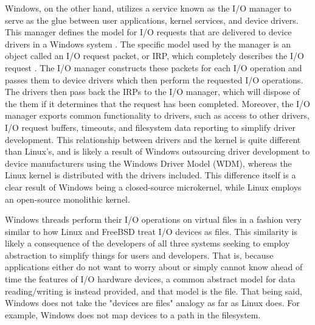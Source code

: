 \documentclass[onecolumn, draftclsnofoot,10pt, compsoc]{IEEEtran}
\begin{document}
Windows, on the other hand, utilizes a service known as the I/O manager to serve as the glue between user applications, kernel services, and device drivers. This manager defines the model for I/O requests that are delivered to device drivers in a Windows system \cite{WindowsInternals2}. The specific model used by the manager is an object called an I/O request packet, or IRP, which completely describes the I/O request \cite{WindowsInternals2}. The I/O manager constructs these packets for each I/O operation and passes them to device drivers which then perform the requested I/O operations. The drivers then pass back the IRPs to the I/O manager, which will dispose of the them if it determines that the request has been completed. Moreover, the I/O manager exports common functionality to drivers, such as access to other drivers, I/O request buffers, timeouts, and filesystem data reporting to simplify driver development. This relationship between drivers and the kernel is quite different than Linux's, and is likely a result of Windows outsourcing driver development to device manufacturers using the Windows Driver Model (WDM), whereas the Linux kernel is distributed with the drivers included. This difference itself is a clear result of Windows being a closed-source microkernel, while Linux employs an open-source monolithic kernel. 

Windows threads perform their I/O operations on virtual files in a fashion very similar to how Linux and FreeBSD treat I/O devices as files. This similarity is likely a consequence of the developers of all three systems seeking to employ abstraction to simplify things for users and developers. That is, because applications either do not want to worry about or simply cannot know ahead of time the features of I/O hardware devices, a common abstract model for data reading/writing is instead provided, and that model is the file. That being said, Windows does not take the "devices are files" analogy as far as Linux does. For example, Windows does not map devices to a path in the filesystem.
\end{document}
